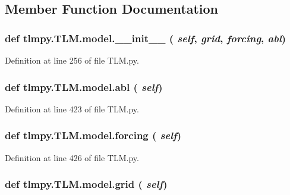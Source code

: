 \subsection{Member Function Documentation}
\hypertarget{classtlmpy_1_1TLM_1_1model_a21eea6ae9141be3ba1d8ca2898dd5f76}{
\subsubsection[{\_\-\_\-init\_\-\_\-}]{\setlength{\rightskip}{0pt plus 5cm}def tlmpy.TLM.model.\_\-\_\-init\_\-\_\- ( {\em self}, \/   {\em grid}, \/   {\em forcing}, \/   {\em abl})}}
\label{classtlmpy_1_1TLM_1_1model_a21eea6ae9141be3ba1d8ca2898dd5f76}


Definition at line 256 of file TLM.py.\hypertarget{classtlmpy_1_1TLM_1_1model_a7bf2b7f63e2dde23c33a65c2ec879d4b}{
\subsubsection[{abl}]{\setlength{\rightskip}{0pt plus 5cm}def tlmpy.TLM.model.abl ( {\em self})}}
\label{classtlmpy_1_1TLM_1_1model_a7bf2b7f63e2dde23c33a65c2ec879d4b}


Definition at line 423 of file TLM.py.\hypertarget{classtlmpy_1_1TLM_1_1model_a6353d38da302cdf535295488b77e5238}{
\subsubsection[{forcing}]{\setlength{\rightskip}{0pt plus 5cm}def tlmpy.TLM.model.forcing ( {\em self})}}
\label{classtlmpy_1_1TLM_1_1model_a6353d38da302cdf535295488b77e5238}


Definition at line 426 of file TLM.py.\hypertarget{classtlmpy_1_1TLM_1_1model_a37f36a6b5a42f9a879fc6b9094a0cca5}{
\subsubsection[{grid}]{\setlength{\rightskip}{0pt plus 5cm}def tlmpy.TLM.model.grid ( {\em self})}}
\label{classtlmpy_1_1TLM_1_1model_a37f36a6b5a42f9a879fc6b9094a0cca5}


